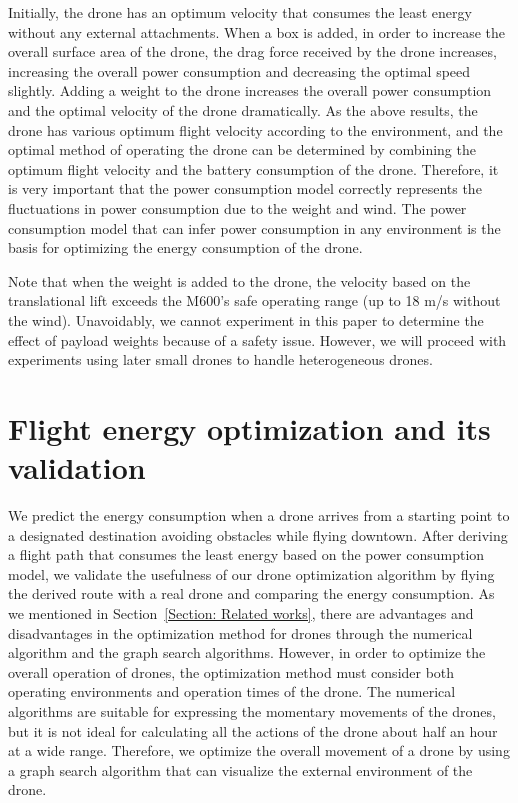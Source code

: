 \documentclass[journal]{./template/IEEEtran}
\begin{document}
Initially, the drone has an optimum velocity that consumes the least energy without any external attachments. 
When a box is added, in order to increase the overall surface area of the drone, the drag force received by the drone increases, increasing the overall power consumption and decreasing the optimal speed slightly. 
Adding a weight to the drone increases the overall power consumption and the optimal velocity of the drone dramatically.
As the above results, the drone has various optimum flight velocity according to the environment, and the optimal method of operating the drone can be determined by combining the optimum flight velocity and the battery consumption of the drone. 
Therefore, it is very important that the power consumption model correctly represents the fluctuations in power consumption due to the weight and wind. 
The power consumption model that can infer power consumption in any environment is the basis for optimizing the energy consumption of the drone.

Note that when the weight is added to the drone, the velocity based on the translational lift exceeds the M600's safe operating range (up to 18 m/s without the wind). Unavoidably, we cannot experiment in this paper to determine the effect of payload weights because of a safety issue. However, we will proceed with experiments using later small drones to handle heterogeneous drones.










\section{Flight energy optimization and its validation}

We predict the energy consumption when a drone arrives from a starting point to a designated destination avoiding obstacles while flying downtown. 
After deriving a flight path that consumes the least energy based on the power consumption model, we validate the usefulness of our drone optimization algorithm by flying the derived route with a real drone and comparing the energy consumption.
As we mentioned in Section~\ref{Section: Related works}, there are advantages and disadvantages in the optimization method for drones through the numerical algorithm and the graph search algorithms.
However, in order to optimize the overall operation of drones, the optimization method must consider both operating environments and operation times of the drone.
The numerical algorithms are suitable for expressing the momentary movements of the drones, but it is not ideal for calculating all the actions of the drone about half an hour at a wide range.
Therefore, we optimize the overall movement of a drone by using a graph search algorithm that can visualize the external environment of the drone.
\end{document}
